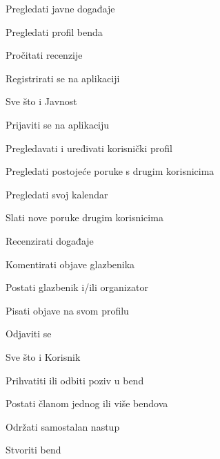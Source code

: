 		
		\begin{packed_enum}

		\item  {}
						
			\begin{packed_enum}
				\item Pregledati javne događaje
				\item Pregledati profil benda
				\item Pročitati recenzije
				\item Registrirati se na aplikaciji
			\end{packed_enum}
					
		\item  {}
			
			\begin{packed_enum}
				
				\item Sve što i Javnost
				\item Prijaviti se na aplikaciju
				\item Pregledavati i uređivati korisnički profil
				\item Pregledati postojeće poruke s drugim korisnicima
				\item Pregledati svoj kalendar
				\item Slati nove poruke drugim korisnicima
				\item Recenzirati događaje
				\item Komentirati objave glazbenika
				\item Postati glazbenik i/ili organizator
				\item Pisati objave na svom profilu
				\item Odjaviti se 
				
			\end{packed_enum}
			
			
		\item  {}
			
			\begin{packed_enum}
				
				\item Sve što i Korisnik
				\item Prihvatiti ili odbiti poziv u bend
				\item Postati članom jednog ili više bendova
				\item Održati samostalan nastup
				\item Stvoriti bend
			\end{packed_enum}
			

\end{packed_enum}
